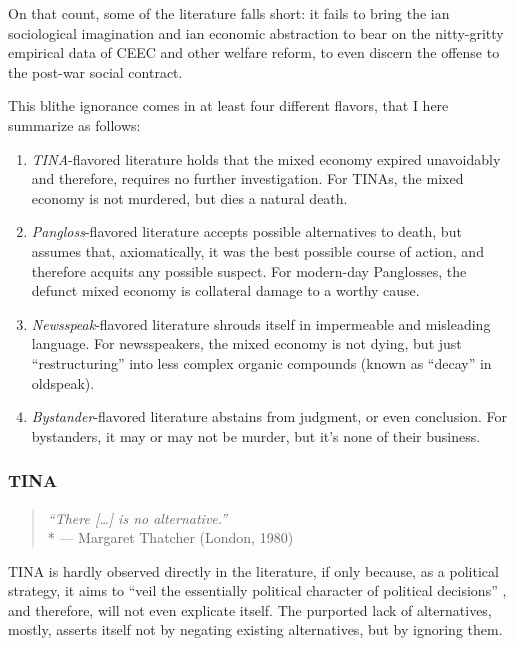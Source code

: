 \documentclass[11pt,a4paper,oneside,openright]{article}
\begin{document}
On that count, some of the literature falls short: 
it fails to bring the \citeauthor{Mills-1959-aa}ian sociological imagination and \citeauthor{Keynes1936}ian economic abstraction to bear on the nitty-gritty empirical data of \gls{CEEC} and other welfare reform, to even discern  the offense to the post-war social contract. 

This blithe ignorance comes in at least four different flavors, that I here summarize as follows:
\begin{enumerate}
	\item \emph{TINA}-flavored literature holds that the mixed economy expired unavoidably and therefore, requires no further investigation. 
	For TINAs, the mixed economy is not murdered, but dies a natural death.
	\item \emph{Pangloss}-flavored literature accepts possible alternatives to death, but assumes that, axiomatically, it was the best possible course of action, and therefore acquits any possible suspect. 
	For modern-day Panglosses, the defunct mixed economy is collateral damage to a worthy cause.
	\item \emph{Newsspeak}-flavored literature shrouds itself in impermeable and misleading language. 
	For newsspeakers, the mixed economy is not dying, but just ``restructuring'' into less complex organic compounds (known as ``decay'' in oldspeak).
	\item \emph{Bystander}-flavored literature abstains from judgment, or even conclusion. 
	For bystanders, it may or may not be murder, but it's none of their business. %
\end{enumerate}

\subsubsection{TINA}

\begin{quote}
	\emph{``There [\ldots] is no alternative.''}\\*
	--- Margaret Thatcher (London, 1980)
\end{quote}

TINA is hardly observed directly in the literature, if only because, as a political strategy, it aims to ``veil the essentially political character of political decisions'' \citep[314]{Bluhdorn-2007-aa}, and therefore, will not even explicate itself. 
The purported lack of alternatives, mostly, asserts itself not by negating existing alternatives, but by ignoring them.  
\end{document}

